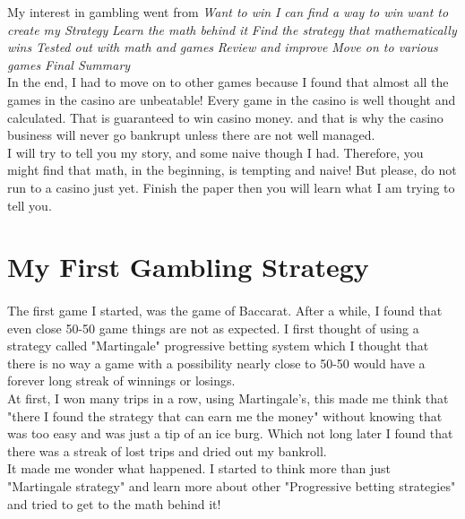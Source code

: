 \documentclass{article}
\begin{document}
	My interest in gambling went from \emph{Want to win} \rightarrow \emph{I can find a way to win} \rightarrow \emph{want to create my Strategy} \rightarrow \emph{Learn the math behind it} \rightarrow \emph{Find the strategy that mathematically wins} \rightarrow \emph{Tested out with math and games} \rightarrow \emph{Review and improve} \rightarrow \emph{Move on to various games} \rightarrow \emph{Final Summary}\\
	
	In the end, I had to move on to other games because I found that almost all the  games in the casino are unbeatable!  Every game in the casino is well thought and calculated.  That is guaranteed to win casino money. and that is why the casino business will never go bankrupt unless there are not well managed. \\
	
	I will try to tell you my story, and some naive though I had.  Therefore, you might find that math, in the beginning, is tempting and naive!  But please, do not run to a casino just yet.  Finish the paper then you will learn what I am trying to tell you.\\

\clearpage
\section{My First Gambling Strategy}
\paragraph{ }
The first game I started, was the game of Baccarat.  After a while, I found that even close 50-50 game things are not as expected.  I first thought of using a strategy called "Martingale" progressive betting system which I thought that there is no way a game with a possibility nearly close to 50-50 would have a forever long streak of winnings or losings.\\

At first, I won many trips in a row, using Martingale's, this made me think that "there I found the strategy that can earn me the money" without knowing that was too easy and was just a tip of an ice burg.  Which not long later I found that there was a streak of lost trips and dried out my bankroll.\\

It made me wonder what happened.  I started to think more than just "Martingale strategy" and learn more about other "Progressive betting strategies" and tried to get to the math behind it!\\
\end{document}
